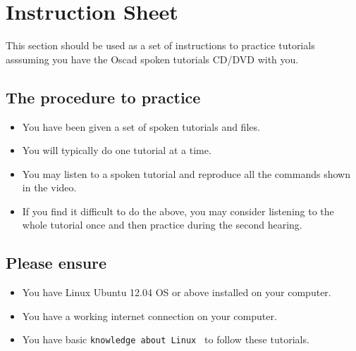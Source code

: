 \section{Instruction Sheet}

This section should be used as a set of instructions to practice tutorials asssuming you have the Oscad spoken tutorials CD/DVD with you.



\subsection{The procedure to practice}
  \begin{itemize}
  \item You have been given a set of spoken tutorials and files.
  \item You will typically do one tutorial at a time.
  \item You may listen to a spoken tutorial and reproduce all the commands shown in the video.
  \item If you find it difficult to do the above, you may consider listening to the whole tutorial once and then practice during the second hearing.
 
 \end{itemize}
  

\subsection{Please ensure}
  \begin{itemize}
  \item You have Linux Ubuntu 12.04 OS or above installed on your computer.
\item You have a working internet connection on your computer.
 \item You have basic {\tt knowledge about Linux } to follow these tutorials.
 \end{itemize}


